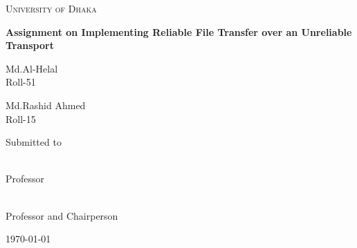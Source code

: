 \documentclass[12pt,a4paper]{report}
\begin{document}
\begin{titlepage}
\centering
{\scshape\LARGE University of Dhaka \par}
\vspace{1.5cm}
{\huge\bfseries Assignment on Implementing Reliable File Transfer over an Unreliable Transport\par}
\vspace{3cm}
{\Large \parbox{5cm}{\centering Md.Al-Helal\\Roll-51}\hspace{1cm}\parbox{6cm}{\centering Md.Rashid Ahmed\\Roll-15}}
\vfill
Submitted to\\
\vspace{0.8cm}
\parbox{9cm}{ \\ Professor}\hspace{1cm}\parbox{5cm}{ \\Professor and Chairperson}
\vfill
{\large \today\par}
\end{titlepage}
\end{document}
